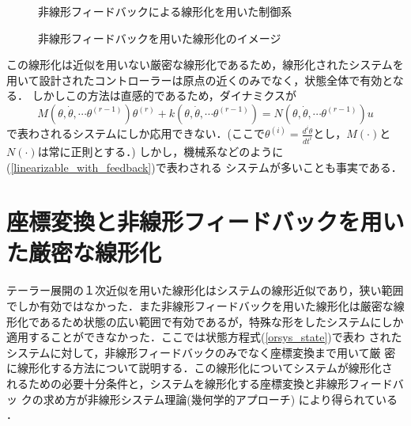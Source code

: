 \begin{figure}[htbp]
 \begin{center}
  \caption{非線形フィードバックによる線形化を用いた制御系}
  \label{config_nonlinear_feedback}
 \end{center}
\end{figure}
\begin{figure}[htbp]
 \begin{center}
  \caption{非線形フィードバックを用いた線形化のイメージ}
  \label{image_lin_w_fb}
 \end{center}
\end{figure}

この線形化は近似を用いない厳密な線形化であるため，線形化されたシステムを
用いて設計されたコントローラーは原点の近くのみでなく，状態全体で有効となる．
しかしこの方法は直感的であるため，ダイナミクスが
\begin{equation}
 M(\theta,\dot{\theta}, \cdots \theta^{(r-1)}) \theta^{(r)} 
  + k(\theta,\dot{\theta}, \cdots \theta^{(r-1)}) 
  = N(\theta,\dot{\theta}, \cdots \theta^{(r-1)}) u
  \label{linearizable_with_feedback}
\end{equation}
で表わされるシステムにしか応用できない．(ここで$\theta^{(i)} =
\frac{d^{i} \theta}{dt^i}$とし，$M(\cdot)$と$N(\cdot)$は常に正則とする．)
しかし，機械系などのように(\ref{linearizable_with_feedback})で表わされる
システムが多いことも事実である．
\section{座標変換と非線形フィードバックを用いた厳密な線形化}
\label{exact_linear}
テーラー展開の１次近似を用いた線形化はシステムの線形近似であり，狭い範囲
でしか有効ではなかった．また非線形フィードバックを用いた線形化は厳密な線
形化であるため状態の広い範囲で有効であるが，特殊な形をしたシステムにしか
適用することができなかった．ここでは状態方程式(\ref{orsys_state})で表わ
されたシステムに対して，非線形フィードバックのみでなく座標変換まで用いて厳
密に線形化する方法について説明する．この線形化についてシステムが線形化さ
れるための必要十分条件と，システムを線形化する座標変換と非線形フィードバッ
クの求め方が非線形システム理論(幾何学的アプローチ)
\cite{ishijima,isidori}により得られている
\cite{ishijima,isidori,jakubczyk,su,hunt:su:meyer}．

